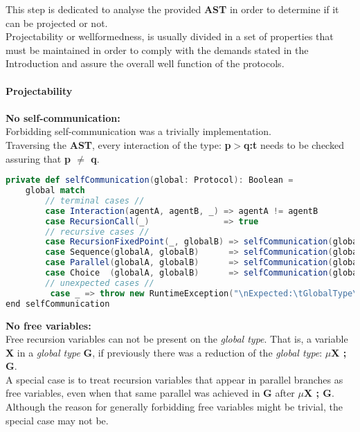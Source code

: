\normalsize
This step is dedicated to analyse the provided \textbf{AST} in order to determine if it can be projected or not.\\
Projectability or wellformedness, is usually divided in a set of properties that must be maintained in order to comply with the demands stated in the Introduction and assure the overall well function of the protocols.\\
\\
\textbf{Projectability}\\
\\
\textbf{No self-communication:}\\
Forbidding self-communication was a trivially implementation.\\
Traversing the \textbf{AST}, every interaction of the type: \textbf{p$>$q:t} needs to be checked assuring that \textbf{p $\neq$ q}. \cite{cledou2022api}\\
\begin{lstlisting}[language=Scala, caption=No Self-Communication]
private def selfCommunication(global: Protocol): Boolean =
    global match
        // terminal cases //
        case Interaction(agentA, agentB, _) => agentA != agentB
        case RecursionCall(_)               => true
        // recursive cases //
        case RecursionFixedPoint(_, globalB) => selfCommunication(globalB)
        case Sequence(globalA, globalB)      => selfCommunication(globalA) && selfCommunication(globalB)
        case Parallel(globalA, globalB)      => selfCommunication(globalA) && selfCommunication(globalB)
        case Choice  (globalA, globalB)      => selfCommunication(globalA) && selfCommunication(globalB)
        // unexpected cases //
         case _ => throw new RuntimeException("\nExpected:\tGlobalType\nFound:\t\tLocalType")
end selfCommunication
\end{lstlisting}
\textbf{No free variables:}\\
Free recursion variables can not be present on the \textit{global type}. That is, a variable \textbf{X} in a \textit{global type} \textbf{G}, if previously there was a reduction of the \textit{global type}: \textbf{$\mu$X ; G}.\cite{denielou2011dynamic}\\
A special case is to treat recursion variables that appear in parallel branches as free variables, even when that same parallel was achieved in \textbf{G} after \textbf{$\mu$X ; G}. \cite{denielou2011dynamic}\\
Although the reason for generally forbidding free variables might be trivial, the special case may not be.\\
